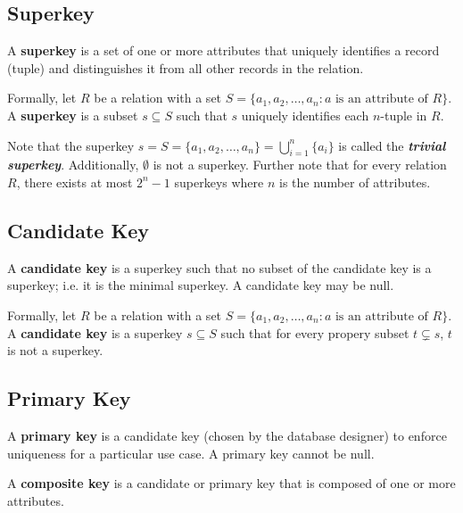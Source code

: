\documentclass{report}
\newenvironment{definition}[1]{\begin{tcolorbox}[title={Definition: #1}]}{\end{tcolorbox}}
\renewcommand{\bf}[1]{\textbf{{#1}}}
\newcommand{\ib}[1]{\textit{\textbf{{#1}}}}
\begin{document}
\subsection{Superkey}
\begin{definition}{Superkey}
    A \bf{superkey} is a set of one or more attributes that uniquely identifies a record (tuple) and 
    distinguishes it from all other records in the relation.\vspace{10pt}

    Formally, let $R$ be a relation with a set $S = \{a_1, a_2, \ldots, a_n : a 
    \text{ is an attribute of } R\}$. A \bf{superkey} is a subset $s \subseteq S$ such that $s$ 
    uniquely identifies each $n$-tuple in $R$.
\end{definition}
Note that the superkey $s = S = \{a_1, a_2, \ldots, a_n\} = \bigcup^{n}_{i = 1} \{a_i\}$ is called the \ib{trivial superkey}. 
Additionally, $\emptyset$ is not a superkey. Further note that for every relation $R$, there exists 
at most $2^n - 1$ superkeys where $n$ is the number of attributes.


\subsection{Candidate Key}
\begin{definition}{Candidate Key}
    A \bf{candidate key} is a superkey such that no subset of the candidate key is a superkey; i.e.
    it is the minimal superkey. A candidate key may be null.\vspace{10pt}

    Formally, let $R$ be a relation with a set $S = \{a_1, a_2, \ldots, a_n : a 
    \text{ is an attribute of } R\}$. A \bf{candidate key} is a superkey $s \subseteq S$ such that
    for every propery subset $t \subsetneq s$, $t$ is not a superkey.
\end{definition}

\subsection{Primary Key}
\begin{definition}{Primary Key and Composite Key}
    A \bf{primary key} is a candidate key (chosen by the database designer) to enforce uniqueness
    for a particular use case. A primary key cannot be null.\vspace{10pt}

    A \bf{composite key} is a candidate or primary key that is composed of one or more attributes.
\end{definition}
\end{document}
